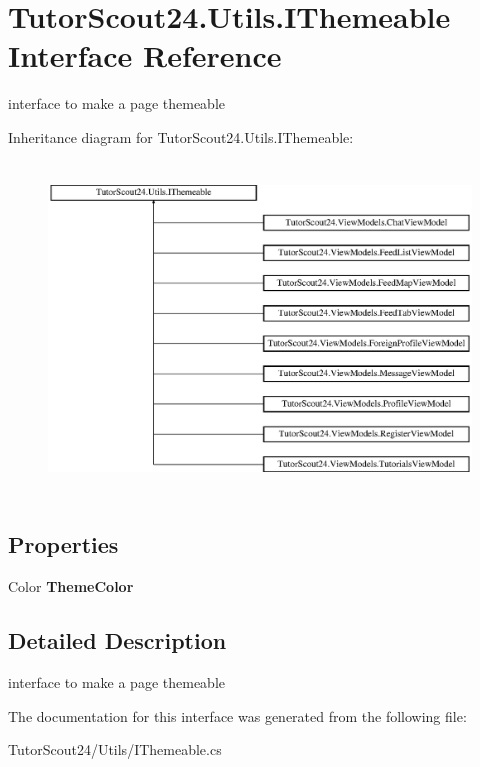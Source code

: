 \hypertarget{interface_tutor_scout24_1_1_utils_1_1_i_themeable}{}\section{Tutor\+Scout24.\+Utils.\+I\+Themeable Interface Reference}
\label{interface_tutor_scout24_1_1_utils_1_1_i_themeable}


interface to make a page themeable  


Inheritance diagram for Tutor\+Scout24.\+Utils.\+I\+Themeable\+:\begin{figure}[H]
\begin{center}
\leavevmode
\includegraphics[height=8.860759cm]{interface_tutor_scout24_1_1_utils_1_1_i_themeable}
\end{center}
\end{figure}
\subsection*{Properties}
\begin{DoxyCompactItemize}
\item 
\mbox{\label{interface_tutor_scout24_1_1_utils_1_1_i_themeable_a2e8d352ae7b0344dccdae2be208405ed}} 
Color {\bfseries Theme\+Color}
\end{DoxyCompactItemize}


\subsection{Detailed Description}
interface to make a page themeable 



The documentation for this interface was generated from the following file\+:\begin{DoxyCompactItemize}
\item 
Tutor\+Scout24/\+Utils/I\+Themeable.\+cs\end{DoxyCompactItemize}
